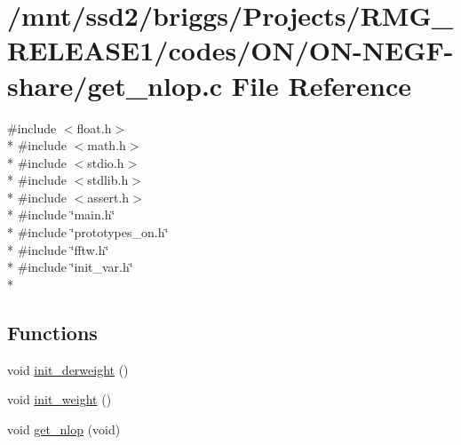 \hypertarget{_o_n_2_o_n-_n_e_g_f-share_2get__nlop_8c}{\section{/mnt/ssd2/briggs/\-Projects/\-R\-M\-G\-\_\-\-R\-E\-L\-E\-A\-S\-E1/codes/\-O\-N/\-O\-N-\/\-N\-E\-G\-F-\/share/get\-\_\-nlop.c File Reference}
\label{_o_n_2_o_n-_n_e_g_f-share_2get__nlop_8c}
}
{\ttfamily \#include $<$float.\-h$>$}\\*
{\ttfamily \#include $<$math.\-h$>$}\\*
{\ttfamily \#include $<$stdio.\-h$>$}\\*
{\ttfamily \#include $<$stdlib.\-h$>$}\\*
{\ttfamily \#include $<$assert.\-h$>$}\\*
{\ttfamily \#include \char`\"{}main.\-h\char`\"{}}\\*
{\ttfamily \#include \char`\"{}prototypes\-\_\-on.\-h\char`\"{}}\\*
{\ttfamily \#include \char`\"{}fftw.\-h\char`\"{}}\\*
{\ttfamily \#include \char`\"{}init\-\_\-var.\-h\char`\"{}}\\*
\subsection*{Functions}
\begin{DoxyCompactItemize}
\item 
void \hyperlink{_o_n_2_o_n-_n_e_g_f-share_2get__nlop_8c_afb0102166824d1ff9c2fd960d46418e2}{init\-\_\-derweight} ()
\item 
void \hyperlink{_o_n_2_o_n-_n_e_g_f-share_2get__nlop_8c_af4412b7ada119a225a77bf89cf7a89cd}{init\-\_\-weight} ()
\item 
void \hyperlink{_o_n_2_o_n-_n_e_g_f-share_2get__nlop_8c_aa95f1182143aec2e4d1ce140520f3fa1}{get\-\_\-nlop} (void)
\end{DoxyCompactItemize}


